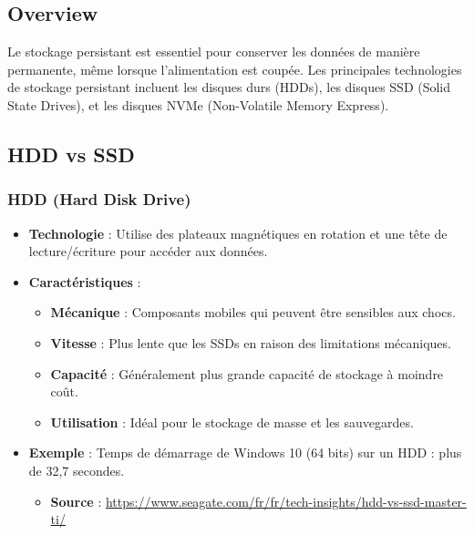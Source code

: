 \documentclass[10pt,a4paper]{article}
\begin{document}
\subsection*{Overview}
Le stockage persistant est essentiel pour conserver les données de manière permanente, même lorsque l'alimentation est coupée. Les principales technologies de stockage persistant incluent les disques durs (HDDs), les disques SSD (Solid State Drives), et les disques NVMe (Non-Volatile Memory Express).

\subsection*{HDD vs SSD}

\subsubsection*{HDD (Hard Disk Drive)}
\begin{itemize}
    \item \textbf{Technologie} : Utilise des plateaux magnétiques en rotation et une tête de lecture/écriture pour accéder aux données.
    \item \textbf{Caractéristiques} :
    \begin{itemize}
        \item \textbf{Mécanique} : Composants mobiles qui peuvent être sensibles aux chocs.
        \item \textbf{Vitesse} : Plus lente que les SSDs en raison des limitations mécaniques.
        \item \textbf{Capacité} : Généralement plus grande capacité de stockage à moindre coût.
        \item \textbf{Utilisation} : Idéal pour le stockage de masse et les sauvegardes.
    \end{itemize}
    \item \textbf{Exemple} : Temps de démarrage de Windows 10 (64 bits) sur un HDD : plus de 32,7 secondes.
    \begin{itemize}
        \item \textbf{Source} : \url{https://www.seagate.com/fr/fr/tech-insights/hdd-vs-ssd-master-ti/}
    \end{itemize}
\end{itemize}
\end{document}
